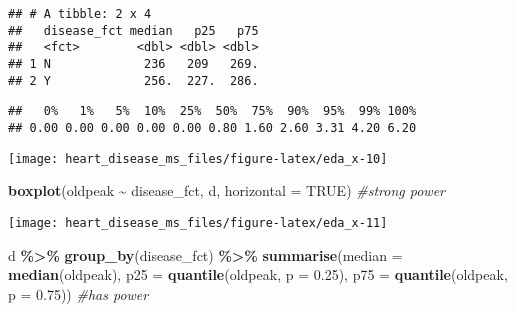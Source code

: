 \documentclass[
]{article}
\newenvironment{Shaded}{\begin{snugshade}}{\end{snugshade}}
\newcommand{\AttributeTok}[1]{\textcolor[rgb]{0.13,0.29,0.53}{#1}}
\newcommand{\CommentTok}[1]{\textcolor[rgb]{0.56,0.35,0.01}{\textit{#1}}}
\newcommand{\ConstantTok}[1]{\textcolor[rgb]{0.56,0.35,0.01}{#1}}
\newcommand{\FloatTok}[1]{\textcolor[rgb]{0.00,0.00,0.81}{#1}}
\newcommand{\FunctionTok}[1]{\textcolor[rgb]{0.13,0.29,0.53}{\textbf{#1}}}
\newcommand{\NormalTok}[1]{#1}
\newcommand{\SpecialCharTok}[1]{\textcolor[rgb]{0.81,0.36,0.00}{\textbf{#1}}}
\begin{document}
\begin{verbatim}
## # A tibble: 2 x 4
##   disease_fct median   p25   p75
##   <fct>        <dbl> <dbl> <dbl>
## 1 N             236   209   269.
## 2 Y             256.  227.  286.
\end{verbatim}

\begin{Shaded}
\end{Shaded}

\begin{verbatim}
##   0%   1%   5%  10%  25%  50%  75%  90%  95%  99% 100% 
## 0.00 0.00 0.00 0.00 0.00 0.80 1.60 2.60 3.31 4.20 6.20
\end{verbatim}

\begin{Shaded}
\end{Shaded}

\begin{center}\texttt{[image: heart\_disease\_ms\_files/figure-latex/eda\_x-10]} \end{center}

\begin{Shaded}
\begin{Highlighting}[]
\FunctionTok{boxplot}\NormalTok{(oldpeak }\SpecialCharTok{\textasciitilde{}}\NormalTok{ disease\_fct, d, }\AttributeTok{horizontal =} \ConstantTok{TRUE}\NormalTok{) }\CommentTok{\#strong power}
\end{Highlighting}
\end{Shaded}

\begin{center}\texttt{[image: heart\_disease\_ms\_files/figure-latex/eda\_x-11]} \end{center}

\begin{Shaded}
\begin{Highlighting}[]
\NormalTok{d }\SpecialCharTok{\%\textgreater{}\%}
  \FunctionTok{group\_by}\NormalTok{(disease\_fct) }\SpecialCharTok{\%\textgreater{}\%}
  \FunctionTok{summarise}\NormalTok{(}\AttributeTok{median =} \FunctionTok{median}\NormalTok{(oldpeak),}
            \AttributeTok{p25 =} \FunctionTok{quantile}\NormalTok{(oldpeak, }\AttributeTok{p =} \FloatTok{0.25}\NormalTok{),}
            \AttributeTok{p75 =} \FunctionTok{quantile}\NormalTok{(oldpeak, }\AttributeTok{p =} \FloatTok{0.75}\NormalTok{)) }\CommentTok{\#has power}
\end{Highlighting}
\end{Shaded}
\end{document}
